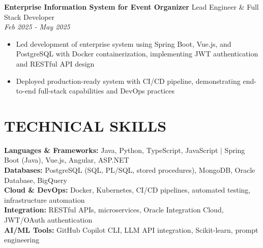 \documentclass[10pt,a4paper]{article}
\newcommand{\experienceheader}[4]{
    \textbf{#1} \hfill #2 \\
    \textit{#3} \hfill \textit{#4}
}
\begin{document}
\experienceheader{Enterprise Information System for Event Organizer}{Lead Engineer \& Full Stack Developer}{}{Feb 2025 - May 2025}
\begin{itemize}[leftmargin=*, itemsep=1pt, topsep=1pt]
    \item Led development of enterprise system using Spring Boot, Vue.js, and PostgreSQL with Docker containerization, implementing JWT authentication and RESTful API design
    \item Deployed production-ready system with CI/CD pipeline, demonstrating end-to-end full-stack capabilities and DevOps practices
\end{itemize}


\section*{TECHNICAL SKILLS}

\textbf{Languages \& Frameworks:} Java, Python, TypeScript, JavaScript $|$ Spring Boot (Java), Vue.js, Angular, ASP.NET \\
\textbf{Databases:} PostgreSQL (SQL, PL/SQL, stored procedures), MongoDB, Oracle Database, BigQuery \\
\textbf{Cloud \& DevOps:} Docker, Kubernetes, CI/CD pipelines, automated testing, infrastructure automation \\
\textbf{Integration:} RESTful APIs, microservices, Oracle Integration Cloud, JWT/OAuth authentication \\
\textbf{AI/ML Tools:} GitHub Copilot CLI, LLM API integration, Scikit-learn, prompt engineering

% 
\end{document}
